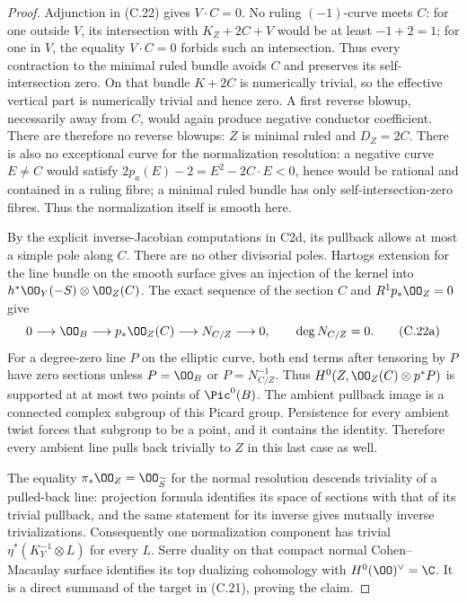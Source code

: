 \begin{proof}
Adjunction in (C.22) gives $V\cdot C=0$. No ruling $(-1)$-curve meets $C$: for one outside $V$, its intersection with $K_Z+2C+V$ would be at least $-1+2=1$; for one in $V$, the equality $V\cdot C=0$ forbids such an intersection. Thus every contraction to the minimal ruled bundle avoids $C$ and preserves its self-intersection zero. On that bundle $K+2C$ is numerically trivial, so the effective vertical part is numerically trivial and hence zero. A first reverse blowup, necessarily away from $C$, would again produce negative conductor coefficient. There are therefore no reverse blowups: $Z$ is minimal ruled and $D_Z=2C$. There is also no exceptional curve for the normalization resolution: a negative curve $E\ne C$ would satisfy $2p_a(E)-2=E^2-2C\cdot E<0$, hence would be rational and contained in a ruling fibre; a minimal ruled bundle has only self-intersection-zero fibres. Thus the normalization itself is smooth here.

By the explicit inverse-Jacobian computations in C2d, its pullback allows at most a simple pole along $C$. There are no other divisorial poles. Hartogs extension for the line bundle on the smooth surface gives an injection of the kernel into $h^*\OO_Y(-S)\otimes\OO_Z(C)$. The exact sequence of the section $C$ and $R^1p_*\OO_Z=0$ give
\[
 0\longrightarrow\OO_B\longrightarrow p_*\OO_Z(C)
   \longrightarrow N_{C/Z}\longrightarrow0,
 \qquad \deg N_{C/Z}=0.                              \tag{C.22a}
\]
For a degree-zero line $P$ on the elliptic curve, both end terms after tensoring by $P$ have zero sections unless $P=\OO_B$ or $P=N_{C/Z}^{-1}$. Thus $H^0(Z,\OO_Z(C)\otimes p^*P)$ is supported at at most two points of $\Pic^0(B)$. The ambient pullback image is a connected complex subgroup of this Picard group. Persistence for every ambient twist forces that subgroup to be a point, and it contains the identity. Therefore every ambient line pulls back trivially to $Z$ in this last case as well.

The equality $\pi_*\OO_Z=\OO_{\widetilde S}$ for the normal resolution descends triviality of a pulled-back line: projection formula identifies its space of sections with that of its trivial pullback, and the same statement for its inverse gives mutually inverse trivializations. Consequently one normalization component has trivial $\eta^*(K_Y^{-1}\otimes L)$ for every $L$. Serre duality on that compact normal Cohen--Macaulay surface identifies its top dualizing cohomology with $H^0(\OO)^\vee=\C$. It is a direct summand of the target in (C.21), proving the claim.
\end{proof}

